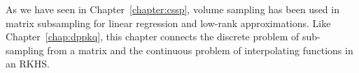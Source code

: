 \documentclass[twoside,11pt]{book}
\numberwithin{theorem}{chapter}
\numberwithin{definition}{chapter}
\numberwithin{proposition}{chapter}
\numberwithin{corollary}{chapter}
\numberwithin{example}{chapter}
\numberwithin{lemma}{chapter}
\numberwithin{assumption}{chapter}
\numberwithin{equation}{chapter}
\numberwithin{figure}{chapter}
\begin{document}


As we have seen in Chapter~\ref{chapter:cssp}, volume sampling has been used in matrix subsampling for linear regression and low-rank approximations. Like Chapter~\ref{chap:dppkq}, this chapter connects the discrete problem of sub-sampling from a matrix and the continuous problem of interpolating functions in an RKHS.













\end{document}
